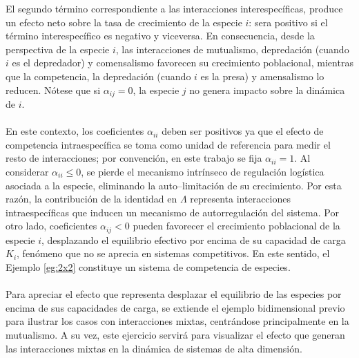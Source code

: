 El segundo término correspondiente a las interacciones interespecíficas, produce un efecto neto sobre la tasa de crecimiento de la especie $i$: sera positivo si el término interespecífico es negativo y viceversa. En consecuencia, desde la perspectiva de la especie $i$, las interacciones de mutualismo, depredación (cuando $i$ es el depredador) y comensalismo favorecen su crecimiento poblacional, mientras que  la competencia, la depredación  (cuando $i$ es la presa) y amensalismo lo reducen. Nótese que si $\alpha_{ij}=0$, la especie $j$ no genera impacto sobre la dinámica de $i$.\\
\\
En este contexto, los coeficientes $\alpha_{ii}$ deben ser positivos ya que el efecto de competencia intraespecífica se toma como unidad de referencia para medir el resto de interacciones; por convención, en este trabajo se fija $\alpha_{ii}=1$. Al considerar $\alpha_{ii}\leq0$, se pierde el mecanismo intrínseco de regulación logística asociada a la especie, eliminando la auto--limitación de su crecimiento. Por esta razón, la contribución de la identidad en $\Lambda$ representa interacciones intraespecíficas que inducen un mecanismo de autorregulación del sistema. Por otro lado, coeficientes $\alpha_{ij}<0$ pueden favorecer el crecimiento poblacional de la especie $i$, desplazando el equilibrio efectivo por encima de su capacidad de carga $K_i$, fenómeno que no se aprecia en sistemas competitivos. En este sentido, el Ejemplo \ref{eg:2x2} constituye un sistema de competencia de especies.
\\
\\
Para apreciar el efecto que representa desplazar el equilibrio de las especies por encima de sus capacidades de carga, se extiende el ejemplo bidimensional previo para ilustrar los casos con interacciones mixtas, centrándose principalmente en la mutualismo. A su vez, este ejercicio servirá para visualizar el efecto que generan las interacciones mixtas en la dinámica de sistemas de alta dimensión.

